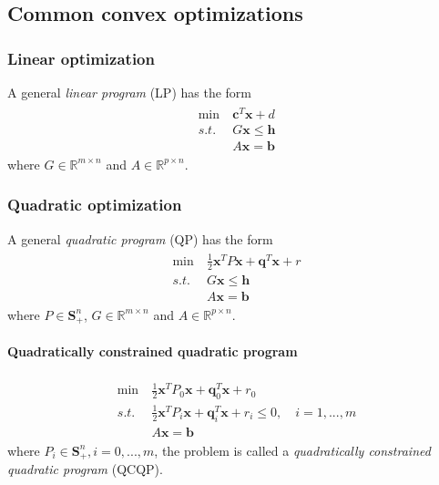 \subsection{Common convex optimizations}
\subsubsection{Linear optimization}
A general \emph{linear program} (LP) has the form
\begin{align}
    \begin{array}{lll}
        \min \ &\mathbf{c}^T \mathbf{x} + d \\
        s.t. \ &G\mathbf{x} \leq \mathbf{h} \\
        &A\mathbf{x} = \mathbf{b}
    \end{array}
    \label{pro:lp1}
\end{align}
where $G \in \mathbb{R}^{m \times n}$ and
$A \in \mathbb{R}^{p \times n}$.

\subsubsection{Quadratic optimization}
A general \emph{quadratic program} (QP) has the form
\begin{align}
    \begin{array}{lll}
        \min \ &\frac{1}{2} \mathbf{x}^T P \mathbf{x} + 
        \mathbf{q}^T \mathbf{x} + r \\
        s.t. \ &G\mathbf{x} \leq \mathbf{h} \\
        &A\mathbf{x} = \mathbf{b}
    \end{array}
    \label{pro:qp1}
\end{align}
where $P \in \mathbf{S}_+^n$,
$G \in \mathbb{R}^{m \times n}$ and
$A \in \mathbb{R}^{p \times n}$.


\paragraph{Quadratically constrained quadratic program}
\begin{align}
    \begin{array}{lll}
        \min \ &\frac{1}{2} \mathbf{x}^T P_0 \mathbf{x}
        + \mathbf{q}_0^T \mathbf{x} + r_0 \\
        s.t. \ &\frac{1}{2} \mathbf{x}^T P_i \mathbf{x}
        + \mathbf{q}_i^T \mathbf{x} + r_i \leq 0, \quad i = 1,...,m \\
        & A \mathbf{x} = \mathbf{b}
    \end{array}
    \label{pro:qcqp1}
\end{align}
where  $P_i \in \mathbf{S}_+^n, i = 0,...,m$,
the problem is called a \emph{quadratically constrained
quadratic program} (QCQP).


